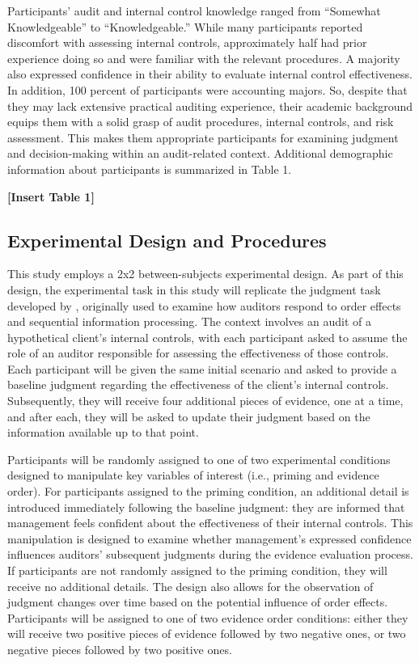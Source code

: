 \documentclass[12pt,english]{article}
\begin{document}
Participants’ audit and internal control knowledge ranged from “Somewhat Knowledgeable” to “Knowledgeable.” While many participants reported discomfort with assessing internal controls, approximately half had prior experience doing so and were familiar with the relevant procedures. A majority also expressed confidence in their ability to evaluate internal control effectiveness. In addition, 100 percent of participants were accounting majors. So, despite that they may lack extensive practical auditing experience, their academic background equips them with a solid grasp of audit procedures, internal controls, and risk assessment. This makes them appropriate participants for examining judgment and decision-making within an audit-related context. Additional demographic information about participants is summarized in Table 1.

\begin{center}
    \textbf{[Insert Table 1]}
\end{center}

\subsection{Experimental Design and Procedures}
This study employs a 2x2 between-subjects experimental design. As part of this design, the experimental task in this study will replicate the judgment task developed by \citet{ashton1988}, originally used to examine how auditors respond to order effects and sequential information processing. The context involves an audit of a hypothetical client’s internal controls, with each participant asked to assume the role of an auditor responsible for assessing the effectiveness of those controls. Each participant will be given the same initial scenario and asked to provide a baseline judgment regarding the effectiveness of the client’s internal controls. Subsequently, they will receive four additional pieces of evidence, one at a time, and after each, they will be asked to update their judgment based on the information available up to that point. 

Participants will be randomly assigned to one of two experimental conditions designed to manipulate key variables of interest (i.e., priming and evidence order). For participants assigned to the priming condition, an additional detail is introduced immediately following the baseline judgment: they are informed that management feels confident about the effectiveness of their internal controls. This manipulation is designed to examine whether management's expressed confidence influences auditors’ subsequent judgments during the evidence evaluation process. If participants are not randomly assigned to the priming condition, they will receive no additional details. The design also allows for the observation of judgment changes over time based on the potential influence of order effects. Participants will be assigned to one of two evidence order conditions: either they will receive two positive pieces of evidence followed by two negative ones, or two negative pieces followed by two positive ones.
\end{document}
